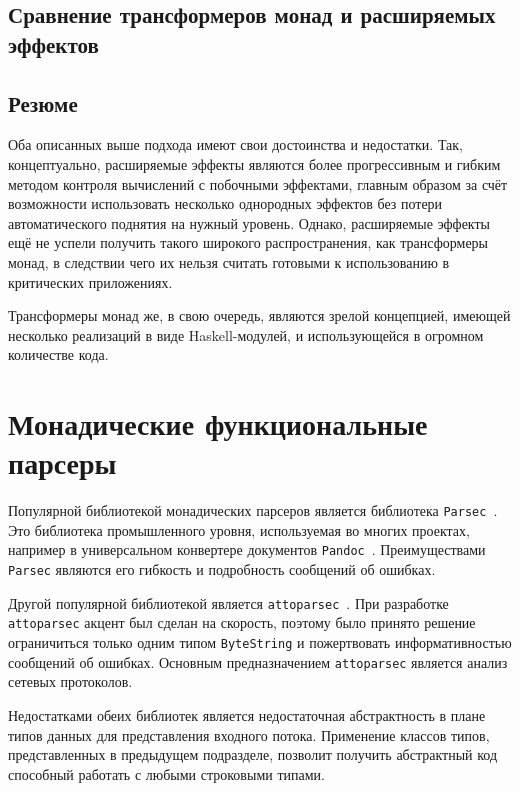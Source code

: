   \subsection{Сравнение трансформеров монад и расширяемых эффектов}

  \subsection{Резюме}

    Оба описанных выше подхода имеют свои достоинства и недостатки. Так, концептуально, 
    расширяемые эффекты являются более прогрессивным и гибким методом контроля 
    вычислений с побочными эффектами, главным образом за счёт возможности использовать   
    несколько однородных эффектов без потери автоматического поднятия на нужный уровень. 
    Однако, расширяемые эффекты ещё не успели получить такого широкого распространения, 
    как трансформеры монад, в следствии чего их нельзя считать готовыми к использованию 
    в критических приложениях. 

    Трансформеры монад же, в свою очередь, являются зрелой концепцией, имеющей несколько
    реализаций в виде Haskell-модулей, и использующейся в огромном количестве кода. 

\section{Монадические функциональные парсеры}

  Популярной библиотекой монадических парсеров является библиотека
  \lstinline{Parsec}~\cite{parsec}. Это библиотека промышленного уровня,
  используемая во многих проектах, например в универсальном конвертере документов
  \lstinline{Pandoc}~\cite{pandoc}. Преимуществами \lstinline{Parsec} являются
   его гибкость и подробность сообщений об ошибках.

  Другой популярной библиотекой является
  \lstinline{attoparsec}~\cite{attoparsec}. При разработке
  \lstinline{attoparsec} акцент был сделан на скорость, поэтому было принято
  решение ограничиться только одним типом \lstinline{ByteString} и пожертвовать
  информативностью сообщений об ошибках. Основным предназначением
  \lstinline{attoparsec} является анализ сетевых протоколов.

  Недостатками обеих библиотек является недостаточная абстрактность в плане типов
  данных для представления входного потока. Применение классов типов,
  представленных в предыдущем подразделе, позволит получить абстрактный код
  способный работать с любыми строковыми типами.

